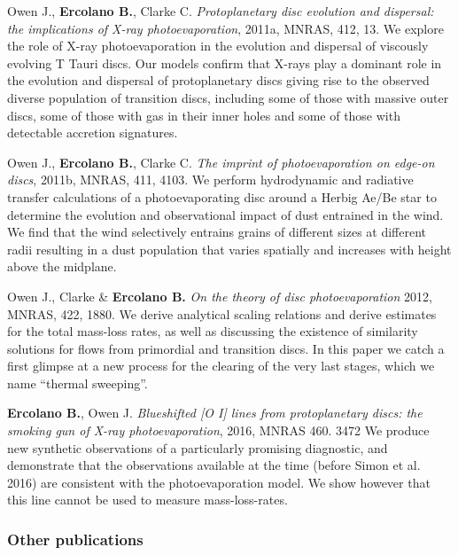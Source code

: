 \documentclass[10pt,fleqn,twoside]{article}
\newcommand{\Tcol}{\color{blue}}
\newenvironment{literature}%
 {\begin{multicols}{2}\begin{small}\begin{list}{}{%
   \setlength{\topsep}{0em}%
   \setlength{\parskip}{0em}%
   \setlength{\parsep}{0em}%
   \setlength{\itemsep}{0em}%
   \setlength{\rightmargin}{0em}%
   \setlength{\leftmargin}{2em}%
   \setlength{\itemindent}{-2em}}}%
 {\end{list}\end{small}\end{multicols}}
\begin{document}
\begin{literature}
\item Owen J., \textbf{Ercolano B.}, Clarke C.  \textit{
  Protoplanetary disc evolution and dispersal: the implications of X-ray photoevaporation}, 2011a, MNRAS, 412, 13.
  We explore the role of X-ray photoevaporation in the evolution and
  dispersal of viscously evolving T Tauri discs. Our models confirm
  that X-rays play a dominant role in the evolution and dispersal of
  protoplanetary discs giving rise to the observed diverse population
  of transition discs, including some of those with massive outer
  discs, some of those
  with gas in their inner holes and some of those with detectable accretion
  signatures.  

\item Owen J., \textbf{Ercolano B.}, Clarke C.  \textit{
    The imprint of photoevaporation on edge-on discs}, 2011b, MNRAS, 411, 4103.
  We perform hydrodynamic and radiative transfer calculations of a
  photoevaporating disc around a Herbig Ae/Be star to determine the
  evolution and observational impact of dust entrained in the wind. We
  find that the wind selectively entrains grains of different sizes at
  different radii resulting in a dust population that varies spatially
  and increases with height above the midplane.

\item Owen J., Clarke \& \textbf{Ercolano B.}  \textit{On the theory of disc photoevaporation}
  2012, MNRAS, 422, 1880. We derive analytical scaling relations and
  derive estimates for the total mass-loss rates, as well as
  discussing the existence of similarity solutions for flows from
  primordial and transition discs. In this paper we catch a first
  glimpse at a new process for the clearing of the very last stages,
  which we name ``thermal sweeping''.

\item \textbf{Ercolano B.}, Owen J.  {\em Blueshifted [O I] lines from
    protoplanetary discs: the smoking gun of X-ray photoevaporation},
  2016, MNRAS 460. 3472
  We produce new synthetic observations of a particularly promising
  diagnostic, and demonstrate that the observations available at the
  time (before Simon et al. 2016) are consistent with the
  photoevaporation model. We show however that this line cannot be
  used to measure mass-loss-rates. 

\end{literature}


\subsubsection{\Tcol Other publications}
\end{document}
